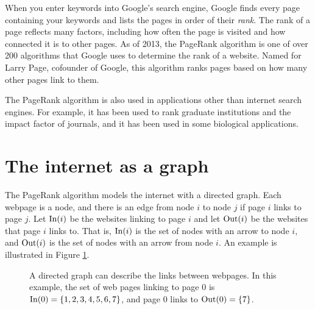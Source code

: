 \label{lab:PageRank}

When you enter keywords into Google's search engine, Google finds every page containing your keywords and lists the pages in order of their \emph{rank}.
The rank of a page reflects many factors, including how often the page is visited and how connected it is to other pages.
As of 2013, the PageRank algorithm is one of over 200 algorithms that Google uses to determine the rank of a website.
Named for Larry Page, cofounder of Google, this algorithm ranks pages based on how many other pages link to them.

The PageRank algorithm is also used in applications other than internet search engines.
For example, it has been used to rank graduate institutions and the impact factor of journals, and it has been used in some biological applications.

\section*{The internet as a graph}
The PageRank algorithm models the internet with a directed graph. 
Each webpage is a node, and there is an edge from node $i$ to node $j$ if page $i$ links to page $j$.
Let $\operatorname{In}(i)$ be the websites linking to page $i$ and let $\operatorname{Out}(i)$ be the websites that page $i$ links to. 
That is, $\operatorname{In}(i)$ is the set of nodes with an arrow to node $i$, and $\operatorname{Out}(i)$ is the set of nodes with an arrow from node $i$.
An example is illustrated in Figure \ref{fig:network1}.

\begin{figure}
\centering
{}

\caption{A directed graph can describe the links between webpages. In this example, the set of web pages linking to page 0 is $\operatorname{In}(0)=\{1,2,3,4,5,6,7\}$, and page 0 links to $\operatorname{Out}(0)=\{7\}$.}
\label{fig:network1}
\end{figure}

